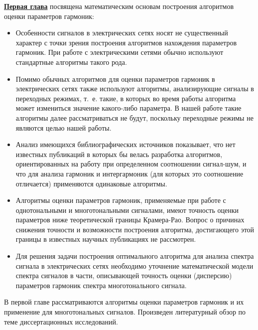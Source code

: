 \underline{\textbf{Первая глава}} посвящена %
математическим основам построения алгоритмов оценки параметров гармоник:
\begin{itemize}
\item Особенности сигналов в электрических сетях носят не существенный характер с точки зрения построения алгоритмов нахождения параметров гармоник. При работе с электрическими сетями обычно используют стандартные алгоритмы такого рода.
\item Помимо обычных алгоритмов для оценки параметров гармоник в электрических сетях также используют алгоритмы, анализирующие сигналы в переходных режимах, т.~е. такие, в которых во время работы алгоритма может измениться значение какого-либо параметра. В нашей работе такие алгоритмы далее рассматриваться не будут, поскольку переходные режимы не являются целью нашей работы.
\item Анализ имеющихся библиографических источников показывает, что нет известных публикаций в которых бы велась разработка алгоритмов, ориентированных на работу при определенном соотношении сигнал-шум, и что для анализа гармоник и интергармоник (для которых это соотношение отличается) применяются одинаковые алгоритмы.
\item Алгоритмы оценки параметров гармоник, применяемые при работе с однотональными и многотональными сигналами, имеют точность оценки параметров ниже теоретической границы Крамера-Рао. Вопрос о причинах снижения точности и возможности построения алгоритма, достигающего этой границы в известных научных публикациях не рассмотрен.
\item Для решения задачи построения оптимального алгоритма для анализа спектра сигнала в электрических сетях необходимо уточнение математической модели спектра сигналов в части, описывающей точность оценки (дисперсию) параметров гармоник спектра многотонального сигнала.
\end{itemize}

В первой главе рассматриваются алгоритмы оценки параметров гармоник и их применение для многотональных сигналов. Произведен литературный обзор по теме диссертационных исследований.

